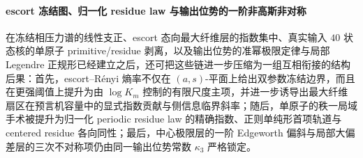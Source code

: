 \paragraph{escort 冻结图、归一化 residue law 与输出位势的一阶非高斯非对称}
在冻结相压力谱的线性支正、escort 态向最大纤维层的指数集中、真实输入 \(40\) 状态核的单原子 primitive/residue 剥离，以及输出位势的准幂极限定律与局部 Legendre 正规形已经建立之后，还可把这些链进一步压缩为一组互相衔接的结构后果：首先，escort--Rényi 熵率不仅在 \((a,s)\)-平面上给出双参数冻结边界，而且在更强阈值上提升为由 \(\log K_m\) 控制的有限尺度主项，并进一步诱导出最大纤维扇区在预言机容量中的显式指数贡献与侧信息临界斜率；随后，单原子的秩一局域手术被提升为归一化 periodic residue law 的精确指数、正则单纯形首项轨道与 centered residue 各向同性；最后，中心极限层的一阶 Edgeworth 偏斜与局部大偏差层的三次不对称项仍由同一输出位势常数 \(\kappa_3\) 严格锁定。

